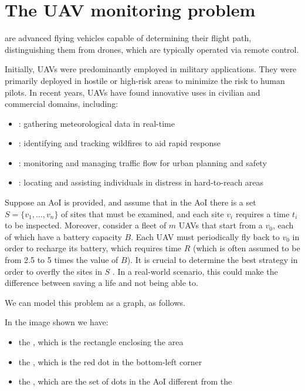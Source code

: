 \documentclass[a4paper, 12pt]{report}
\begin{document}
    \chapter{The UAV monitoring problem}
    
     are advanced flying vehicles capable of  determining their flight path, distinguishing them from drones, which are typically operated via remote control.

    Initially, UAVs were predominantly employed in military applications. They were primarily deployed in hostile or high-risk areas to minimize the risk to human pilots. In recent years, UAVs have found innovative uses in civilian and commercial domains, including:

    \begin{itemize}
        \item {}: gathering meteorological data in real-time
        \item {}: identifying and tracking wildfires to aid rapid response
        \item {}: monitoring and managing traffic flow for urban planning and safety
        \item {}: locating and assisting individuals in distress in hard-to-reach areas
    \end{itemize}

    Suppose an AoI is provided, and assume that in the AoI there is a set $S = \{v_1, \ldots, v_n\}$ of sites that must be examined, and each site $v_i$ requires a time $t_i$ to be inspected. Moreover, consider a fleet of $m$ UAVs that start from a  $v_0$, each of which have a battery capacity $B$. Each UAV must periodically fly back to $v_0$ in order to recharge its battery, which requires time $R$ (which is often assumed to be from 2.5 to 5 times the value of $B$). It is crucial to determine the best strategy in order to overfly the sites in $S$ . In a real-world scenario, this could make the difference between saving a life and not being able to.

    We can model this problem as a graph, as follows.


    In the image shown we have:

    \begin{itemize}
        \item the , which is the rectangle enclosing the area
        \item the , which is the red dot in the bottom-left corner
        \item the , which are the set of dots in the AoI different from the 
    \end{itemize}
\end{document}
